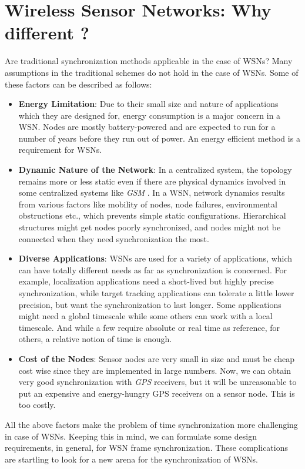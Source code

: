 \documentclass[a4paper,10pt]{report}
\begin{document}
\section{\textbf{Wireless Sensor Networks: Why different ?}}
Are traditional synchronization methods applicable in the case of WSNs? Many assumptions in the traditional schemes do not
hold in the case of WSNs. Some of these factors can be described as follows:
\begin{itemize}
\item \textbf{Energy Limitation}: Due to their small size and nature of applications which they are designed for, energy consumption is a major concern in a WSN. Nodes are mostly battery-powered and are expected to run for a number of years before they run out of power. An energy efficient method is a requirement for WSNs.
\item \textbf{Dynamic Nature of the Network}: In a centralized system, the topology remains more or less static even if there are physical
dynamics involved  in some centralized systems like \textit{GSM} . In a WSN, network dynamics
results from various factors like mobility of nodes, node failures, environmental obstructions etc., which prevents simple static
configurations. Hierarchical structures might get nodes poorly synchronized, and nodes might not be connected when they need
synchronization the most.
\item \textbf{Diverse Applications}: WSNs are used for a variety of applications, which can have totally different needs as far as synchronization is concerned. For example, localization applications need a short-lived but highly
precise synchronization, while target tracking applications can tolerate a little lower precision, but want the synchronization to
last longer. Some applications might need a global timescale while some others can work with a local timescale. And while a few require
absolute or real time as reference, for others, a relative notion of time is enough.
\item \textbf{Cost of the Nodes}: Sensor nodes are very small in size and must be cheap cost wise since they are implemented in large
numbers. Now, we can obtain very good synchronization with \textit{GPS} receivers, but it will be unreasonable to put an expensive and energy-hungry GPS receivers on a sensor node. This is too costly.
\end{itemize}
All the above factors make the problem of time synchronization more challenging in case of WSNs. Keeping this in mind, we can formulate
some design requirements, in general, for WSN frame synchronization. These complications are startling to look for a new arena for the synchronization of WSNs.
\end{document}

